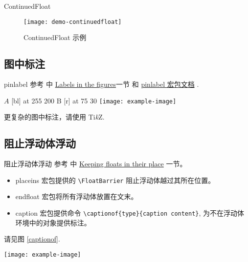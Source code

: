 \documentclass[]{ctexbeamer}
\begin{document}
\begin{frame}[fragile]{ContinuedFloat}
\end{frame}


\begin{frame}
\begin{figure}[]
  \centering
  \texttt{[image: demo-continuedfloat]}
  \caption{ContinuedFloat 示例}
  \label{demo-continuedfloat}
\end{figure}
\end{frame}



\subsection{图中标注}
% 
\begin{frame}[fragile]{pinlabel}
参考 \cite{wiki:floats} 中 \href{https://en.wikibooks.org/wiki/LaTeX/Floats,\_Figures\_and\_Captions\#Labels\_in\_the\_figures}{Labels in the figures}一节 和 \href{http://mirrors.ctan.org/macros/latex/contrib/pinlabel/pinlabdoc.pdf}{pinlabel 宏包文档} \cite{pinlabel}.
\begin{vertlst}
 \small\hair 2pt
\pinlabel $A$ [bl] at 255 200
\pinlabel B [r] at 75 30
\endlabellist
\centering
\texttt{[image: example-image]}
\end{vertlst}
更复杂的图中标注，请使用 Ti\emph{k}Z.
\end{frame}



\subsection{阻止浮动体浮动}
% 
\begin{frame}[fragile]{阻止浮动体浮动}
参考 \cite{wiki:floats} 中 \href{https://en.wikibooks.org/wiki/LaTeX/Floats,\_Figures\_and\_Captions\#Keeping\_floats\_in\_their\_place}{Keeping floats in their place} 一节。
\begin{itemize}
  \item\label{FloatBarrier} placeins 宏包提供的 \verb+\FloatBarrier+ 阻止浮动体越过其所在位置。
  \item\label{endfloat} endfloat 宏包将所有浮动体放置在文末。
  \item caption 宏包提供命令 \verb+\captionof{type}{caption content}+, 为不在浮动体环境中的对象提供标注。
\end{itemize}
\begin{sidelst}
请见图 \ref{captionof}.

\texttt{[image: example-image]}
\label{captionof}
\end{sidelst}
\end{frame}
\end{document}
